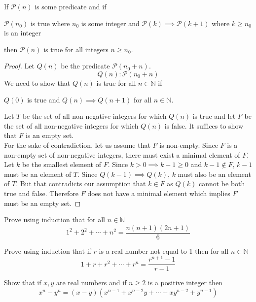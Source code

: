 \documentclass[11pt,numbers=noenddot,svgnames,dvipsnames]{scrartcl}
\begin{document}
\begin{theorem}
    If $\mathcal{P}(n)$ is some predicate and if
    \begin{itemize}
            \ii $\mathcal{P}(n_{0})$ is true where $n_{0}$ is some integer and 
            \ii $\mathcal{P}(k) \implies \mathcal{P}(k+1)$ where $k\geq n_{0}$ is an integer
    \end{itemize}
    then $\mathcal{P}(n)$ is true for all integers $n \geq n_{0}$.
\end{theorem}
\begin{proof}
    Let $Q(n)$ be the predicate $\mathcal{P}(n_{0} + n)$.
    \[
        Q(n) : \mathcal{P}(n_{0} + n)
    \]
    We need to show that $Q(n)$ is  true for all $n \in \mathbb{N}$ if
    \begin{itemize}
        \ii $Q(0)$ is true and 
        \ii $Q(n) \implies Q(n + 1)$ for all $n \in \mathbb{N}$.
    \end{itemize}
    Let $T$ be the set of all non-negative integers for which $Q(n)$ is true and let 
    $F$ be the set of all non-negative integers for which $Q(n)$ is false. It suffices to 
    show that $F$ is an empty set. \\
    For the sake of contradiction, let us assume that $F$ is non-empty. Since $F$ is a non-empty 
    set of non-negative integers, there must exist a minimal element of $F$. Let $k$ be the smallest 
    element of $F$. Since $k > 0\implies k-1 \geq 0$ and $k - 1 \not \in F$, $k - 1$ must be an element 
    of $T$. Since $Q(k - 1)\implies Q(k)$, $k$ must also be an element of $T$. But that contradicts our 
    assumption that $k \in F$ as $Q(k)$ cannot be both true and false. Therefore $F$ does not have a minimal 
    element which implies $F$ must be an empty set. 
\end{proof}

\begin{exercise}
Prove using induction that for all $n\in \mathbb{N}$
\[
    1^{2} + 2^{2} + \cdots + n^{2} = \frac{n(n + 1)(2n + 1)}{6}
\]
\end{exercise}
\begin{exercise}
Prove using induction that if $r$ is a real number not equal to 1 then for all $n \in \mathbb{N}$
\[
    1 + r + r^{2} + \cdots + r^{n} = \frac{r^{n + 1} - 1}{r - 1}
\]
\end{exercise}
\begin{exercise}
    Show that if $x, y$ are real numbers and if $n \geq 2$ is a positive integer then 
    \[
        x^{n} - y^{n} = (x - y)\left(x^{n-1} + x^{n-2}y + \cdots + xy^{n-2} + y^{n-1} \right)
    \]
\end{exercise}
\end{document}
